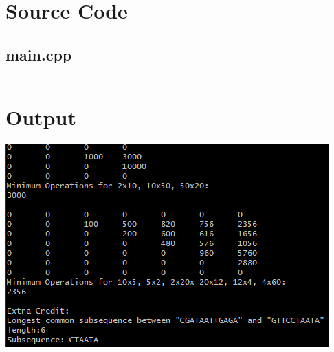 \documentclass{article}
\begin{document}
\section{Source Code}

\subsection{main.cpp}
\inputminted{c++}{../src/main.cpp}

\section{Output}
\includegraphics[]{output.png}
\end{document}
